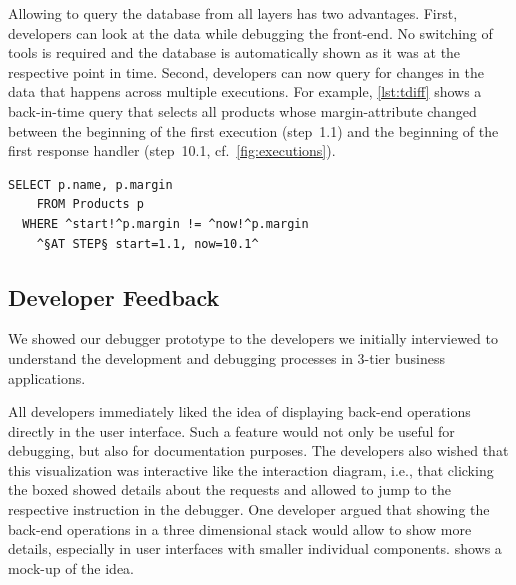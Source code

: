 \documentclass[
      english,
			conference,
      ]{IEEEtran}
\begin{document}
Allowing to query the database from all layers has two advantages.
First, developers can look at the data while debugging the front-end.
No switching of tools is required and the database is automatically shown as it was at the respective point in time.
Second, developers can now query for changes in the data that happens across multiple executions.
For example, \cref{lst:tdiff} shows a back-in-time query that selects all products whose margin-attribute changed between the beginning of the first execution (step~1.1) and the beginning of the first response handler (step~10.1, cf.~\cref{fig:executions}).

\begin{lstlisting}[language=HanaSQL,float=t,caption={A query selecting all products whose margin was changed during the operation.},label=lst:tdiff,numbers=none]
	SELECT p.name, p.margin
	FROM Products p
  WHERE ^start!^p.margin != ^now!^p.margin
	^§AT STEP§ start=1.1, now=10.1^
\end{lstlisting}


\subsection{Developer Feedback}

We showed our debugger prototype to the developers we initially interviewed to understand the development and debugging processes in 3-tier business applications.

All developers immediately liked the idea of displaying back-end operations directly in the user interface.
Such a feature would not only be useful for debugging, but also for documentation purposes.
The developers also wished that this visualization was interactive like the interaction diagram, i.e., that clicking the boxed showed details about the requests and allowed to jump to the respective instruction in the debugger.
One developer argued that showing the back-end operations in a three dimensional stack would allow to show more details, especially in user interfaces with smaller individual components.
 shows a mock-up of the idea.
\end{document}
